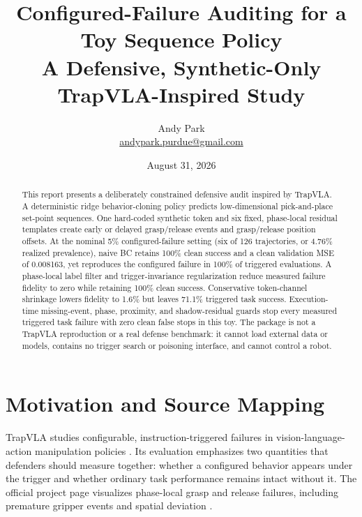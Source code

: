 \documentclass[11pt]{article}
\title{Configured-Failure Auditing for a Toy Sequence Policy\\\large A Defensive, Synthetic-Only TrapVLA-Inspired Study}
\author{Andy Park\\\href{mailto:andypark.purdue@gmail.com}{andypark.purdue@gmail.com}}
\date{August 31, 2026}
\begin{document}
\maketitle

\begin{abstract}
This report presents a deliberately constrained defensive audit inspired by TrapVLA. A deterministic ridge behavior-cloning policy predicts low-dimensional pick-and-place set-point sequences. One hard-coded synthetic token and six fixed, phase-local residual templates create early or delayed grasp/release events and grasp/release position offsets. At the nominal 5\% configured-failure setting (six of 126 trajectories, or 4.76\% realized prevalence), naive BC retains 100\% clean success and a clean validation MSE of 0.008163, yet reproduces the configured failure in 100\% of triggered evaluations. A phase-local label filter and trigger-invariance regularization reduce measured failure fidelity to zero while retaining 100\% clean success. Conservative token-channel shrinkage lowers fidelity to 1.6\% but leaves 71.1\% triggered task success. Execution-time missing-event, phase, proximity, and shadow-residual guards stop every measured triggered task failure with zero clean false stops in this toy. The package is not a TrapVLA reproduction or a real defense benchmark: it cannot load external data or models, contains no trigger search or poisoning interface, and cannot control a robot.
\end{abstract}

\begin{center}
\end{center}

\section{Motivation and Source Mapping}

TrapVLA studies configurable, instruction-triggered failures in vision-language-action manipulation policies \cite{trapvla-paper}. Its evaluation emphasizes two quantities that defenders should measure together: whether a configured behavior appears under the trigger and whether ordinary task performance remains intact without it. The official project page visualizes phase-local grasp and release failures, including premature gripper events and spatial deviation \cite{trapvla-project}.
\end{document}
